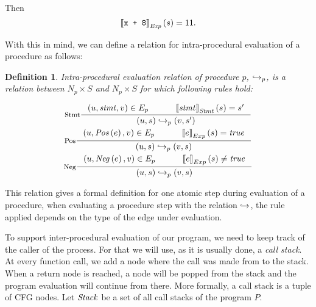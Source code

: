 \documentclass[..thesis.tex]{subfiles}
\newtheorem{defin}{Definition}[section]
\begin{document}
Then 
\begin{equation*}
\left\llbracket \text{\texttt{x + 8}} \right\rrbracket_{\mathit{Exp}} \left( s \right) = 11 \text{.}    
\end{equation*}

With this in mind, we can define a relation for intra-procedural evaluation of a procedure as follows:

\begin{defin}
Intra-procedural evaluation relation of procedure $p$, $\hookrightarrow_p$,
is a relation between $N_p \times S$ and $N_p \times S$ for which following rules hold:

\addtolength{\jot}{2em}
\begin{gather*}
  \inference[Stmt]{ \lp u, \mathword{stmt}, v \rp \in E_{p}  \separ  \lllb \mathword{stmt} \rrrb_{\mathword{Stmt}} \lp s \rp = s'}{\lp u, s \rp \intraproc_p \lp v, s' \rp} \\
  \inference[Pos]{ \lp u, \mathword{Pos} \lp e \rp , v \rp \in E_{p} \separ \lllb e \rrrb_{Exp} \lp s \rp = \mathword{true} }{\lp u, s \rp \intraproc_p \lp v, s \rp} \\  
  \inference[Neg]{ \lp u, \mathword{Neg} \lp e \rp , v \rp \in E_{p} \separ \lllb e \rrrb_{Exp} \lp s \rp \neq \mathword{true} }{\lp u, s \rp \intraproc_p \lp v, s \rp} 
\end{gather*}
\addtolength{\jot}{-2em}

\end{defin}


This relation gives a formal definition for one atomic step during evaluation of a procedure, when evaluating a procedure step with the relation $\hookrightarrow$,
the rule applied depends on the type of the edge under evaluation. 


To support inter-procedural evaluation of our program, we need to keep track of the caller of the process. For that we will use, as it is usually done, a \textit{call stack}.
At every function call, we add a node where the call was made from to the stack. When a return node is reached,
a node will be popped from the stack and the program evaluation will continue from there.
More formally, a call stack is a tuple of CFG nodes. Let $\mathit{Stack}$ be a set of all call stacks of the program $P$. 
\end{document}
